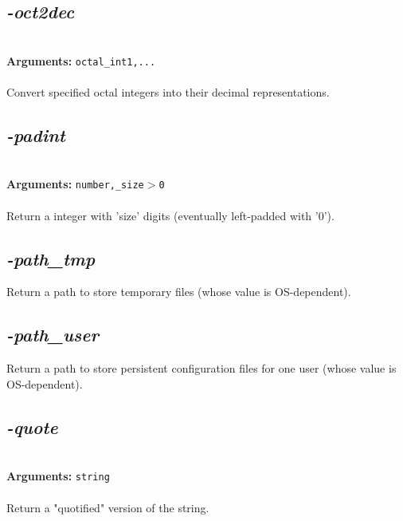 \documentclass[a4paper,11pt,twoside]{book}
\begin{document}
\subsection{\emph{-oct2dec} }\vspace*{-0.5em}
~\\\textbf{Arguments: } 
{\small \texttt{octal\_int1,...}}\\~\\
Convert specified octal integers into their decimal representations.


\subsection{\emph{-padint} }\vspace*{-0.5em}
~\\\textbf{Arguments: } 
{\small \texttt{number,\_size$>$0}}\\~\\
Return a integer with 'size' digits (eventually left-padded with '0').


\subsection{\emph{-path\_tmp} }\vspace*{-0.5em}
Return a path to store temporary files (whose value is OS-dependent).


\subsection{\emph{-path\_user} }\vspace*{-0.5em}
Return a path to store persistent configuration files for one user (whose value is OS-dependent).


\subsection{\emph{-quote} }\vspace*{-0.5em}
~\\\textbf{Arguments: } 
{\small \texttt{string}}\\~\\
Return a "quotified" version of the string.
\end{document}
